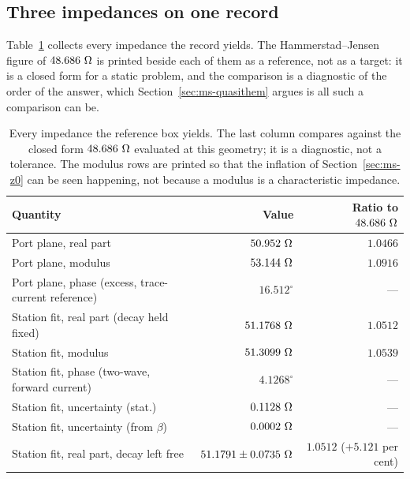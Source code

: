 \subsection{Three impedances on one record}
\label{sec:msres-z0}

Table~\ref{tab:ms-z0} collects every impedance the record yields. The Hammerstad--Jensen figure of $48.686\ \Ohm$
is printed beside each of them as a reference, not as a target: it is a closed form for a static problem, and the
comparison is a diagnostic of the order of the answer, which Section~\ref{sec:ms-quasithem} argues is all such a
comparison can be.

\begin{table}[H]
  \centering
  \caption{Every impedance the reference box yields. The last column compares against the closed form
  $48.686\ \Ohm$ evaluated at this geometry; it is a diagnostic, not a tolerance. The modulus rows are printed so
  that the inflation of Section~\ref{sec:ms-z0} can be seen happening, not because a modulus is a characteristic
  impedance.}
  \label{tab:ms-z0}
  \small
  \begin{tabular}{@{}>{\raggedright\arraybackslash}p{}rr@{}}
    \toprule
    Quantity & Value & Ratio to $48.686\ \Ohm$ \\
    \midrule
    Port plane, real part                                  & $50.952\ \Ohm$              & $1.0466$ \\
    Port plane, modulus                                    & $53.144\ \Ohm$              & $1.0916$ \\
    Port plane, phase (excess, trace-current reference)    & $16.512^\circ$              & --- \\
    Station fit, real part (decay held fixed)              & $51.1768\ \Ohm$             & $1.0512$ \\
    Station fit, modulus                                   & $51.3099\ \Ohm$             & $1.0539$ \\
    Station fit, phase (two-wave, forward current)         & $4.1268^\circ$              & --- \\
    Station fit, uncertainty (stat.)                       & $0.1128\ \Ohm$             & --- \\
    Station fit, uncertainty (from $\beta$)                & $0.0002\ \Ohm$             & --- \\
    Station fit, real part, decay left free                & $51.1791 \pm 0.0735\ \Omega$  & $1.0512$ (${+}5.121$ per cent) \\

\end{tabular}
\end{table}
